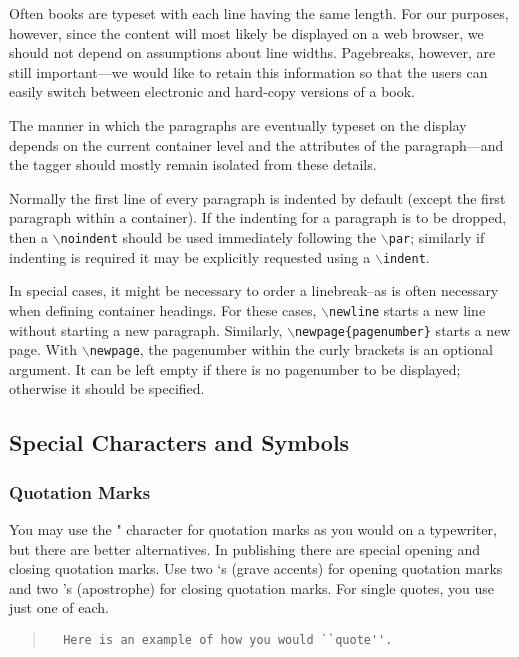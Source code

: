\documentclass[11pt]{article}
\newcommand{\cmd}[1]{{\tt $\backslash$#1}}
\begin{document}
Often books are typeset with each line having the same length. For our
purposes, however, since the content will most likely be displayed on
a web browser, we should not depend on assumptions about line
widths. Pagebreaks, however, are still important---we would like to
retain this information so that the users can easily switch between
electronic and hard-copy versions of a book.

The manner in which the paragraphs are eventually typeset on the
display depends on the current container level and the attributes of
the paragraph---and the tagger should mostly remain isolated from these
details.

Normally the first line of every paragraph is indented by default
(except the first paragraph within a container). If the indenting for
a paragraph is to be dropped, then a \cmd{noindent} should be used
immediately following the \cmd{par}; similarly if indenting is
required it may be explicitly requested using a \cmd{indent}.

In special cases, it might be necessary to order a linebreak--as is
often necessary when defining container headings. For these cases,
\cmd{newline} starts a new line without starting a new
paragraph. Similarly, \cmd{newpage\{pagenumber\}} starts a new
page. With \cmd{newpage}, the pagenumber within the curly brackets is
an optional argument. It can be left empty if there is no pagenumber
to be displayed; otherwise it should be specified.

\subsection{Special Characters and Symbols}

\subsubsection{Quotation Marks}

You may use the " character for quotation marks as you would on a
typewriter, but there are better alternatives. In publishing there are
special opening and closing quotation marks. Use two `s (grave
accents) for opening quotation marks and two 's (apostrophe) for
closing quotation marks. For single quotes, you use just one of each.

\begin{quote}
\begin{verbatim}
  Here is an example of how you would ``quote''.
\end{verbatim}
\end{quote}
\end{document}
